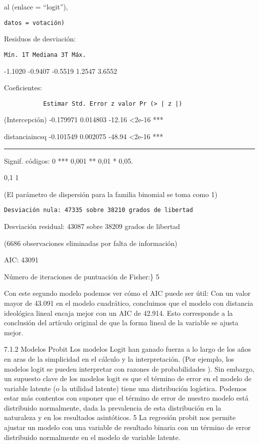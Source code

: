 \documentclass[
]{book}
\begin{document}
al (enlace = ``logit''),

\begin{verbatim}
datos = votación)
\end{verbatim}

Residuos de desviación:

\begin{verbatim}
Mín. 1T Mediana 3T Máx.
\end{verbatim}

-1.1020 -0.9407 -0.5519 1.2547 3.6552

Coeficientes:

\begin{verbatim}
           Estimar Std. Error z valor Pr (> | z |)
\end{verbatim}

(Intercepción) -0.179971 0.014803 -12.16 \textless2e-16 ***

distanciaincsq -0.101549 0.002075 -48.94 \textless2e-16 ***

\begin{center}\rule{0.5\linewidth}{0.5pt}\end{center}

Signif. códigos: 0 *** 0,001 ** 0,01 * 0,05.

0,1 1

(El parámetro de dispersión para la familia binomial se toma como 1)

\begin{verbatim}
Desviación nula: 47335 sobre 38210 grados de libertad
\end{verbatim}

Desviación residual: 43087 sobre 38209 grados de libertad

(6686 observaciones eliminadas por falta de información)

AIC: 43091

Número de iteraciones de puntuación de Fisher:\} 5

Con este segundo modelo podemos ver cómo el AIC puede ser útil: Con un valor mayor de 43.091 en el modelo cuadrático, concluimos que el modelo con distancia ideológica lineal encaja mejor con un AIC de 42.914. Esto corresponde a la conclusión del artículo original de que la forma lineal de la variable se ajusta mejor.

7.1.2 Modelos Probit
Los modelos Logit han ganado fuerza a lo largo de los años en aras de la simplicidad en el cálculo y la interpretación. (Por ejemplo, los modelos logit se pueden interpretar con razones de probabilidades ). Sin embargo, un supuesto clave de los modelos logit es que el término de error en el modelo de variable latente (o la utilidad latente) tiene una distribución logística. Podemos estar más contentos con suponer que el término de error de nuestro modelo está distribuido normalmente, dada la prevalencia de esta distribución en la naturaleza y en los resultados asintóticos. 5 La regresión probit nos permite ajustar un modelo con una variable de resultado binaria con un término de error distribuido normalmente en el modelo de variable latente.
\end{document}
